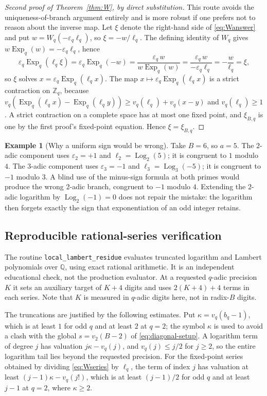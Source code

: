 \documentclass[11pt,letterpaper]{article}
\numberwithin{equation}{section}
\theoremstyle{definition}
\newtheorem{example}[theorem]{Example}
\theoremstyle{remark}
\newcommand{\Z}{\mathbb Z}
\newcommand{\Q}{\mathbb Q}
\newcommand{\eps}{\varepsilon}
\DeclareMathOperator{\Logop}{Log}
\DeclareMathOperator{\Expop}{Exp}
\begin{document}
\begin{proof}[Second proof of Theorem~\ref{thm:W}, by direct substitution]
This route avoids the uniqueness-of-branch argument entirely and is more robust if one prefers not to reason about the inverse map. Let $\xi$ denote the right-hand side of \eqref{eq:Wanswer} and put $w=W_q(-\eps_q\ell_q)$, so $\xi=-w/\ell_q$. The defining identity of $W_q$ gives $w\Expop_q(w)=-\eps_q\ell_q$, hence
\[
 \eps_q\Expop_q(\ell_q\xi)=\eps_q\Expop_q(-w)
 =\frac{\eps_q\,w}{w\Expop_q(w)}
 =\frac{\eps_q\,w}{-\eps_q\ell_q}
 =-\frac{w}{\ell_q}=\xi ,
\]
so $\xi$ solves $x=\eps_q\Expop_q(\ell_q x)$. The map $x\mapsto\eps_q\Expop_q(\ell_q x)$ is a strict contraction on $\Z_q$, because $v_q(\Expop_q(\ell_q x)-\Expop_q(\ell_q y))\ge v_q(\ell_q)+v_q(x-y)$ and $v_q(\ell_q)\ge1$. A strict contraction on a complete space has at most one fixed point, and $\xi_{B,q}$ is one by the first proof's fixed-point equation. Hence $\xi=\xi_{B,q}$.
\end{proof}

\begin{example}[Why a uniform sign would be wrong]\label{ex:sign}
Take $B=6$, so $a=5$. The $2$-adic component uses $\eps_2=+1$ and $\ell_2=\Logop_2(5)$; it is congruent to $1$ modulo $4$. The $3$-adic component uses $\eps_3=-1$ and $\ell_3=\Logop_3(-5)$; it is congruent to $-1$ modulo $3$. A blind use of the minus-sign formula at both primes would produce the wrong $2$-adic branch, congruent to $-1$ modulo $4$. Extending the $2$-adic logarithm by $\Logop_2(-1)=0$ does not repair the mistake: the logarithm then forgets exactly the sign that exponentiation of an odd integer retains.
\end{example}

\subsection{Reproducible rational-series verification}\label{sec:lambert-verify}

The routine \texttt{local\_lambert\_residue} evaluates truncated logarithm and Lambert polynomials over $\Q$, using exact rational arithmetic. It is an independent educational check, not the production evaluator. At a requested $q$-adic precision $K$ it sets an auxiliary target of $K+4$ digits and uses $2(K+4)+4$ terms in each series. Note that $K$ is measured in $q$-adic digits here, not in radix-$B$ digits.

The truncations are justified by the following estimates. Put $\kappa=v_q(b_q-1)$, which is at least $1$ for odd $q$ and at least $2$ at $q=2$; the symbol $\kappa$ is used to avoid a clash with the global $s=v_2(B-2)$ of \eqref{eq:diagonal-setup}. A logarithm term of degree $j$ has valuation $j\kappa-v_q(j)$, and $v_q(j)\le j/2$ for $j\ge2$, so the entire logarithm tail lies beyond the requested precision. For the fixed-point series obtained by dividing \eqref{eq:Wseries} by $\ell_q$, the term of index $j$ has valuation at least $(j-1)\kappa-v_q(j!)$, which is at least $(j-1)/2$ for odd $q$ and at least $j-1$ at $q=2$, where $\kappa\ge2$.
\end{document}
